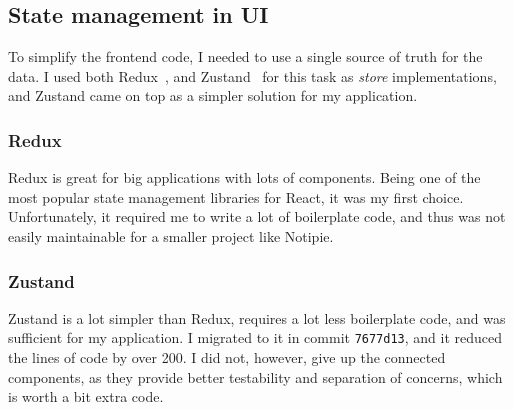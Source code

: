 \subsection{State management in UI}\label{sec:state-management-in-ui}

To simplify the frontend code,
I needed to use a single source of truth for the data.
I used both Redux~\cite{gaeraon_redux_2022},
and Zustand~\cite{kato_zustand_2022} for this task
as \textit{store} implementations,
and Zustand came on top as a simpler solution for my application.

\subsubsection{Redux}\label{sec:redux}

Redux is great for big applications with lots of components.
Being one of the most popular state management libraries for React,
it was my first choice.
Unfortunately,
it required me to write a lot of boilerplate code,
and thus was not easily maintainable
for a smaller project like Notipie.

\subsubsection{Zustand}\label{sec:zustand}

Zustand is a lot simpler than Redux,
requires a lot less boilerplate code,
and was sufficient for my application.
I migrated to it in commit
\texttt{7677d13},
and it reduced the lines of code by over 200.
I did not, however, give up the connected components,
as they provide better testability and separation of concerns,
which is worth a bit extra code.

